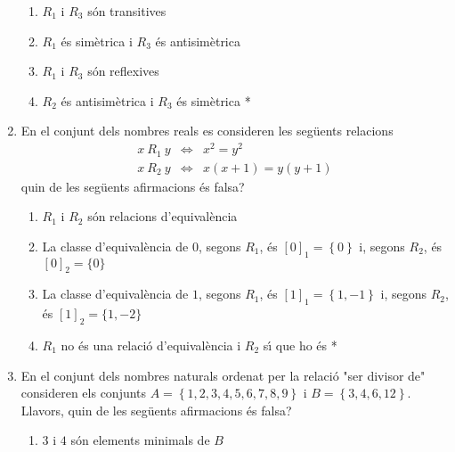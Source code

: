 \begin{enumerate}
\begin{enumerate}
\item $R_{1}$ i $R_{3}$ s\'{o}n transitives

\item $R_{1}$ \'{e}s sim\`{e}trica i $R_{3}$ \'{e}s antisim\`{e}trica

\item $R_{1}$ i $R_{3}$ s\'{o}n reflexives

\item $R_{2}$ \'{e}s antisim\`{e}trica i $R_{3}$ \'{e}s sim\`{e}trica *
\end{enumerate}

\item En el conjunt dels nombres reals es consideren les seg\"{u}ents
relacions%
\begin{equation*}
\begin{array}{lll}
x~R_{1}~y & \Longleftrightarrow & x^{2}=y^{2} \\
x~R_{2}~y & \Longleftrightarrow & x(x+1)=y(y+1)%
\end{array}%
\end{equation*}
quin de les seg\"{u}ents afirmacions \'{e}s falsa?

\begin{enumerate}
\item $R_{1}$ i $R_{2}$ s\'{o}n relacions d'equival\`{e}ncia

\item La classe d'equival\`{e}ncia de $0$, segons $R_{1}$, \'{e}s $\left[ 0%
\right] _{1}=\left\{ 0\right\} $ i, segons $R_{2}$, \'{e}s $\left[ 0\right]
_{2}=\{0\} $

\item La classe d'equival\`{e}ncia de $1$, segons $R_{1}$, \'{e}s $\left[ 1%
\right] _{1}=\left\{ 1,-1\right\} $ i, segons $R_{2}$, \'{e}s $\left[ 1%
\right] _{2}=\{1,-2\}$

\item $R_{1}$ no \'{e}s una relaci\'{o} d'equival\`{e}ncia i $R_{2}$ s\'{\i}
que ho \'{e}s *
\end{enumerate}

\item En el conjunt dels nombres naturals ordenat per la relaci\'{o} "ser
divisor de" consideren els conjunts $A=\left\{ 1,2,3,4,5,6,7,8,9\right\} $ i
$B=\left\{ 3,4,6,12\right\} $. Llavors, quin de les seg\"{u}ents afirmacions
\'{e}s falsa?

\begin{enumerate}
\item $3$ i $4$ s\'{o}n elements minimals de $B$


\end{enumerate}
\end{enumerate}
